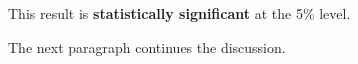 \documentclass{article}
\begin{document}
This result is \textbf{statistically significant} at the 5\% level.

The next paragraph continues the discussion.
\end{document}
